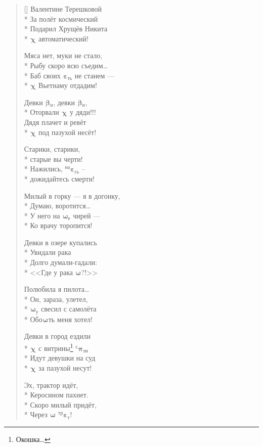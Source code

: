\documentclass[a4paper,oneside,14pt]{scrbook}
\newcommand{\myPiz}[2]{$^{\text{#1}}${\large{$\boldsymbol{\pi}$}}$_{\text{#2}}$}
\newcommand{\myEbt}[2]{$^{\text{#1}}${\large{$\boldsymbol{\varepsilon}$}}$_{\text{#2}}$}
\newcommand{\myXyi}[2]{$^{\text{#1}}${\large{$\boldsymbol{\chi}$}}$_{\text{#2}}$}
\newcommand{\myBld}[2]{$^{\text{#1}}${\large{$\boldsymbol{\beta}$}}$_{\text{#2}}$}
\newcommand{\myAss}[2]{$^{\text{#1}}${\large{$\boldsymbol{\omega}$}}$_{\text{#2}}$}
\begin{document}
\begin{verse}[\versewidth]
        Валентине Терешковой\\* 
        За полёт космический\\*
        Подарил Хрущёв Никита\\*
        {\myXyi{}{}} автоматический!

        Мяса нет, муки не стало,\\*
        Рыбу скоро всю съедим\ldots\\*
        Баб своих {\myEbt{}{ть}} не станем ---\\*
        {\myXyi{}{}} Вьетнаму отдадим!
        
        Девки {\myBld{}{и}}, девки {\myBld{}{и}},\\*
        Оторвали {\myXyi{}{}} у дяди!!!\\
        Дядя плачет и ревёт\\*
        {\myXyi{}{}} под пазухой несёт!
        
        Старики, старики,\\*
        старые вы черти!\\*
        Нажились, {\myEbt{на}{сь}} -- \\*
        дожидайтесь смерти!
        
        Милый в горку --- я в догонку,\\*
        \vin Думаю, воротится\ldots\\*
        У него на {\myAss{}{е}} чирей ---\\*
        \vin Ко врачу торопится!
        
        Девки в озере купались\\*
        \vin Увидали рака\\*
        Долго думали-гадали:\\*
        \vin <<Где у рака {\myAss{}{}}?!>>
        
        Полюбила я пилота\ldots\\*
        Он, зараза, улетел,\\*
        {\myAss{}{у}} свесил с самолёта\\*
        Обо{\myAss{}{}}ть меня хотел!
        
        Девки в город ездили\\*
        {\myXyi{}{}} с витрины\footnote{Окошка\ldots} {\myPiz{с}{ли}}\\*
        Идут девушки на суд\\*
        {\myXyi{}{}} за пазухой несут!
        
        Эх, трактор идёт,\\*
        \vin Керосином пахнет.\\*
        Скоро милый придёт,\\*
        \vin Через {\myAss{}{}} {\myEbt{тр}{т}}!
    \end{verse}
    
\end{document}
